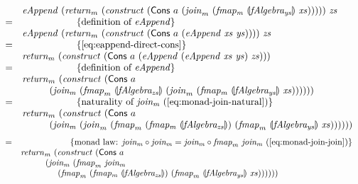 \documentclass{jfp1}
\newcommand{\fold}[1]{\llparenthesis #1 \rrparenthesis}
\newcommand{\eqAnnotation}[1]{\hspace{2cm}\left\{\textrm{#1}\right\}}
\begin{document}
\begin{proof*}
\begin{displaymath}
\begin{array}{cl}
      & \mathit{eAppend}~(\mathit{return}_m~(\mathit{construct}~(\mathsf{Cons}~a~(\mathit{join}_m~(\mathit{fmap_m}~\fold{\mathit{fAlgebra_{ys}}}~\mathit{xs})))))~\mathit{zs} \\
      =&\eqAnnotation{definition of $\mathit{eAppend}$} \\
      & \mathit{eAppend}~(\mathit{return}_m~(\mathit{construct}~(\mathsf{Cons}~a~(\mathit{eAppend}~\mathit{xs}~\mathit{ys}))))~\mathit{zs} \\
      =&\eqAnnotation{\autoref{eq:eappend-direct-cons}} \\
      & \mathit{return_m}~(\mathit{construct}~(\mathsf{Cons}~a~(\mathit{eAppend}~(\mathit{eAppend}~\mathit{xs}~\mathit{ys})~\mathit{zs}))) \\
      =&\eqAnnotation{definition of $\mathit{eAppend}$} \\
      &\mathit{return}_m~(\mathit{construct}~(\mathsf{Cons}~a~\\
      & \hspace{1cm}(\mathit{join_m}~(\mathit{fmap}_m~\fold{\mathit{fAlgebra_{zs}}}~(\mathit{join}_m~(\mathit{fmap_m}~\fold{\mathit{fAlgebra_{ys}}}~\mathit{xs})))))) \\
      =&\eqAnnotation{naturality of $\mathit{join_m}$ (\autoref{eq:monad-join-natural})} \\
      &\mathit{return}_m~(\mathit{construct}~(\mathsf{Cons}~a~\\
      & \hspace{1cm}(\mathit{join_m}~(\mathit{join}_m~(\mathit{fmap}_m~(\mathit{fmap_m}~\fold{\mathit{fAlgebra_{zs}}})~(\mathit{fmap}_m~\fold{\mathit{fAlgebra_{ys}}}~\mathit{xs})))))) \\
    \end{array}
  \end{displaymath}
  \begin{displaymath}
    \begin{array}{cl}
      =&\eqAnnotation{monad law: $\mathit{join_m} \circ \mathit{join_m} = \mathit{join_m} \circ \mathit{fmap}_m~\mathit{join_m}$ (\autoref{eq:monad-join-join})} \\
      &\mathit{return}_m~(\mathit{construct}~(\mathsf{Cons}~a~\\
      & \hspace{1cm}(\mathit{join_m}~(\mathit{fmap}_m~\mathit{join_m}~\\
      & \hspace{1.5cm}(\mathit{fmap}_m~(\mathit{fmap_m}~\fold{\mathit{fAlgebra_{zs}}})~(\mathit{fmap}_m~\fold{\mathit{fAlgebra_{ys}}}~\mathit{xs})))))) \\

\end{array}
\end{displaymath}
\end{proof*}
\end{document}
